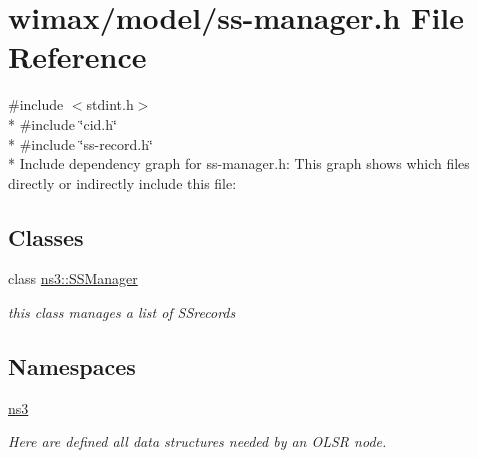 \hypertarget{ss-manager_8h}{}\section{wimax/model/ss-\/manager.h File Reference}
\label{ss-manager_8h}
{\ttfamily \#include $<$stdint.\+h$>$}\\*
{\ttfamily \#include \char`\"{}cid.\+h\char`\"{}}\\*
{\ttfamily \#include \char`\"{}ss-\/record.\+h\char`\"{}}\\*
Include dependency graph for ss-\/manager.h\+:
This graph shows which files directly or indirectly include this file\+:
\subsection*{Classes}
\begin{DoxyCompactItemize}
\item 
class \hyperlink{classns3_1_1SSManager}{ns3\+::\+S\+S\+Manager}
\begin{DoxyCompactList}\small\item\em this class manages a list of S\+Srecords \end{DoxyCompactList}\end{DoxyCompactItemize}
\subsection*{Namespaces}
\begin{DoxyCompactItemize}
\item 
 \hyperlink{namespacens3}{ns3}
\begin{DoxyCompactList}\small\item\em Here are defined all data structures needed by an O\+L\+SR node. \end{DoxyCompactList}\end{DoxyCompactItemize}

